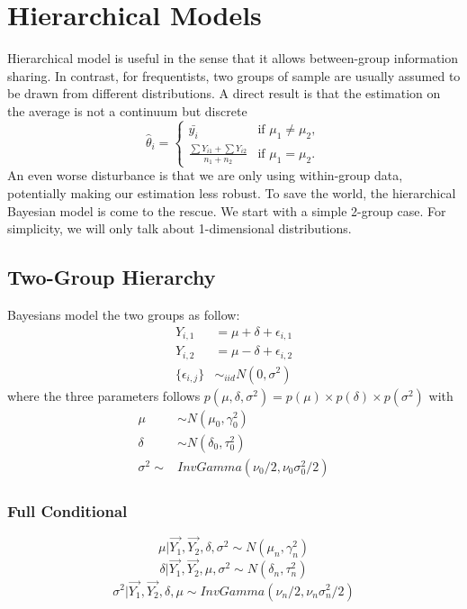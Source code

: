\chapter{Hierarchical Models}
Hierarchical model is useful in the sense that it allows between-group information sharing. In contrast, for frequentists, two groups of sample are usually assumed to be drawn from different distributions. A direct result is that the estimation on the average is not a continuum but discrete
\begin{equation*}
    \hat{\theta}_i = 
    \begin{cases}
        \bar{y_i} & \text{if } \mu_1 \neq \mu_2, \\
        \frac{\sum Y_{i1} + \sum Y_{i2}}{n_1 + n_2} & \text{if } \mu_1 = \mu_2.
    \end{cases}
\end{equation*}
An even worse disturbance is that we are only using within-group data, potentially making our estimation less robust. To save the world, the hierarchical Bayesian model is come to the rescue. We start with a simple 2-group case. For simplicity, we will only talk about 1-dimensional distributions.

\section{Two-Group Hierarchy}
Bayesians model the two groups as follow:
\begin{align*}
    Y_{i, 1} &= \mu + \delta + \epsilon_{i, 1} \\
    Y_{i, 2} &= \mu - \delta + \epsilon_{i, 2} \\
    \{\epsilon_{i,j}\} &\sim_{iid} N(0, \sigma^2)
\end{align*}
where the three parameters follows $p(\mu, \delta, \sigma^2) = p(\mu) \times p(\delta) \times p(\sigma^2)$ with
\begin{align*}
    \mu &\sim N(\mu_0, \gamma_0^2) \\
    \delta &\sim N(\delta_0, \tau_0^2) \\
    \sigma^2 \sim& InvGamma(\nu_0/2, \nu_0\sigma_0^2/2)
\end{align*}

\subsection*{Full Conditional}
\begin{equation*}
    \mu | \vec{Y_1}, \vec{Y_2}, \delta, \sigma^2 \sim N(\mu_n, \gamma_n^2)
\end{equation*}
\begin{equation*}
    \delta | \vec{Y_1}, \vec{Y_2}, \mu, \sigma^2 \sim N(\delta_n, \tau_n^2)
\end{equation*}
\begin{equation*}
    \sigma^2 | \vec{Y_1}, \vec{Y_2}, \delta, \mu \sim InvGamma(\nu_n/2, \nu_n\sigma_n^2/2)
\end{equation*}

